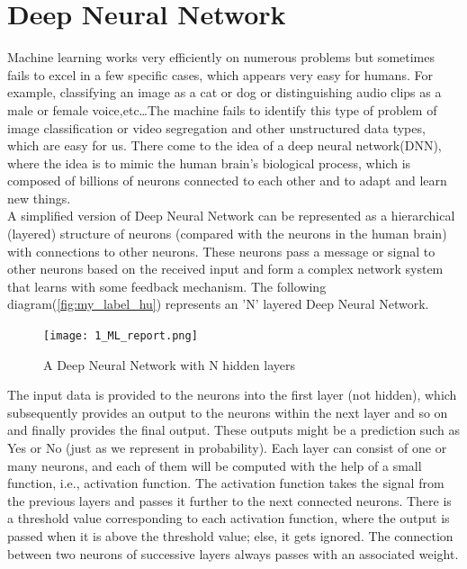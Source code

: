 \section{Deep Neural Network}
Machine learning works very efficiently on numerous problems but sometimes fails to excel in a few specific cases, which appears very easy for humans. For example, classifying an image as a cat or dog or distinguishing audio clips as a male or female voice,etc\dots The machine fails to identify this type of problem of image classification or video segregation and other unstructured data types, which are easy for us. There come to the idea of a deep neural network(DNN), where the idea is to mimic the human brain's biological process, which is composed of billions of neurons connected to each other and to adapt and learn new things\cite{23-25}. \\ 


A simplified version of Deep Neural Network can be represented as a hierarchical (layered) structure of neurons (compared with the neurons in the human brain) with connections to other neurons. These neurons pass a message or signal to other neurons based on the received input and form a complex network system that learns with some feedback mechanism. The following diagram(\autoref{fig:my_label_hu}) represents an 'N' layered Deep Neural Network.\\

\begin{figure}[H]
    \centering
    \texttt{[image: 1\_ML\_report.png]}
    \caption{A Deep Neural Network with N hidden layers}
    \label{fig:my_label_hu}
\end{figure}
The input data is provided to the neurons into the first layer (not hidden), which subsequently provides an output to the neurons within the next layer and so on and finally provides the final output. These outputs might be a prediction such as Yes or No (just as we represent in probability). Each layer can consist of one or many neurons, and each of them will be computed with the help of a small function, i.e., activation function. The activation function takes the signal from the previous layers and passes it further to the next connected neurons. There is a threshold value corresponding to each activation function, where the output is passed when it is above the threshold value; else, it gets ignored. The connection between two neurons of successive layers always passes with an associated weight. \\
 
